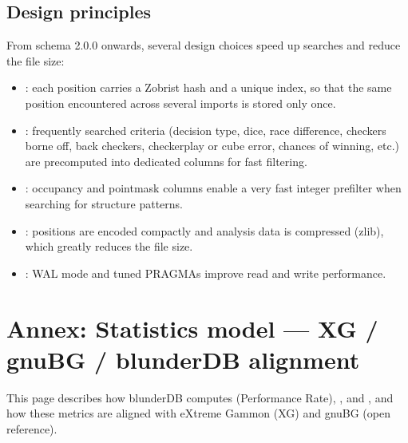 \documentclass[letterpaper,10pt,english]{sphinxmanual}
\begin{document}
\subsection{Design principles}
\label{\detokenize{annexe_db_scheme:principes-de-conception}}
\sphinxAtStartPar
From schema 2.0.0 onwards, several design choices speed up searches and reduce the file size:
\begin{itemize}
\item {} 
\sphinxAtStartPar
{}: each position carries a Zobrist hash and a unique index, so that the same position encountered across several imports is stored only once.

\item {} 
\sphinxAtStartPar
{}: frequently searched criteria (decision type, dice, race difference, checkers borne off, back checkers, checker\sphinxhyphen{}play or cube error, chances of winning, etc.) are precomputed into dedicated columns for fast filtering.

\item {} 
\sphinxAtStartPar
{}: occupancy and point\sphinxhyphen{}mask columns enable a very fast integer prefilter when searching for structure patterns.

\item {} 
\sphinxAtStartPar
{}: positions are encoded compactly and analysis data is compressed (zlib), which greatly reduces the file size.

\item {} 
\sphinxAtStartPar
{}: WAL mode and tuned PRAGMAs improve read and write performance.

\end{itemize}

\sphinxstepscope


\section{Annex: Statistics model — XG / gnuBG / blunderDB alignment}
\label{\detokenize{stats_parity:annexe-modele-de-statistiques-alignement-xg-gnubg-blunderdb}}\label{\detokenize{stats_parity:stats-parity}}\label{\detokenize{stats_parity::doc}}
\sphinxAtStartPar
This page describes how blunderDB computes  (Performance Rate), , and , and how these metrics are aligned with eXtreme Gammon (XG) and gnuBG (open reference).
\end{document}
